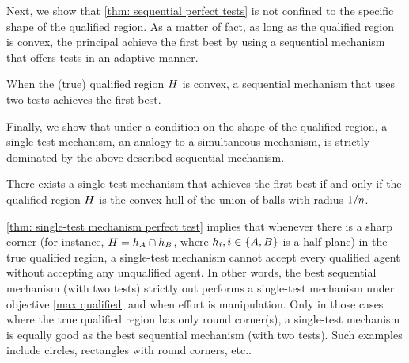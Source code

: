 Next, we show that \cref{thm: sequential perfect tests} is not confined to the specific shape of the qualified region. As a matter of fact, as long as the qualified region is convex, the principal achieve the first best by using a sequential mechanism that offers tests in an adaptive manner.

\begin{proposition}\label{thm: perfect tests arbitrary qualified region}
When the (true) qualified region $H$ is convex,  a sequential mechanism that uses two tests  achieves the first best.
\end{proposition}


Finally, we show that under a condition on the shape of the qualified region, a single-test mechanism, an analogy to a simultaneous mechanism, is strictly dominated by the above described sequential mechanism.


\begin{proposition}\label{thm: single-test mechanism perfect test}
     There exists a single-test mechanism that achieves the first best if and only if the qualified region $H$ is the convex hull of the union of balls with radius $1/\eta$.
\end{proposition}



\cref{thm: single-test mechanism perfect test} implies that whenever there is a sharp corner (for instance, $H=h_A\cap h_B$, where $h_i, i\in \{A,B\}$ is a half plane) in the true qualified region, a single-test mechanism cannot accept every qualified agent without accepting any unqualified agent. 
In other words, the best sequential mechanism (with two tests) strictly out performs a single-test mechanism under objective \ref{max qualified} and when effort is manipulation.
Only in those cases where the true qualified region has only round corner(s),  a single-test mechanism is equally good as the best sequential mechanism (with two tests).
Such examples include circles, rectangles with round corners, etc..